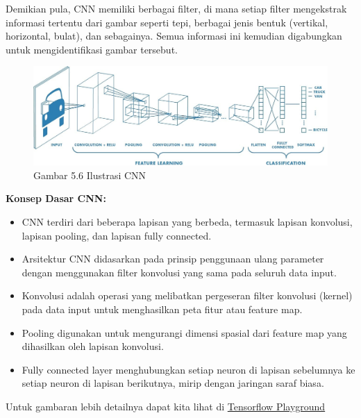 \documentclass[
  letterpaper,
  DIV=11,
  numbers=noendperiod]{scrreprt}
\providecommand{\tightlist}{%
  \setlength{\itemsep}{0pt}\setlength{\parskip}{0pt}}\usepackage{longtable,booktabs,array}
\begin{document}
Demikian pula, CNN memiliki berbagai filter, di mana setiap filter
mengekstrak informasi tertentu dari gambar seperti tepi, berbagai jenis
bentuk (vertikal, horizontal, bulat), dan sebagainya. Semua informasi
ini kemudian digabungkan untuk mengidentifikasi gambar tersebut.

\begin{figure}

{\centering \includegraphics{Asset/cnnillustration.jpeg}

}

\caption{Gambar 5.6 Ilustrasi CNN}

\end{figure}

\textbf{Konsep Dasar CNN:}

\begin{itemize}
\tightlist
\item
  CNN terdiri dari beberapa lapisan yang berbeda, termasuk lapisan
  konvolusi, lapisan pooling, dan lapisan fully connected.\\
\item
  Arsitektur CNN didasarkan pada prinsip penggunaan ulang parameter
  dengan menggunakan filter konvolusi yang sama pada seluruh data
  input.\\
\item
  Konvolusi adalah operasi yang melibatkan pergeseran filter konvolusi
  (kernel) pada data input untuk menghasilkan peta fitur atau feature
  map.\\
\item
  Pooling digunakan untuk mengurangi dimensi spasial dari feature map
  yang dihasilkan oleh lapisan konvolusi.\\
\item
  Fully connected layer menghubungkan setiap neuron di lapisan
  sebelumnya ke setiap neuron di lapisan berikutnya, mirip dengan
  jaringan saraf biasa.
\end{itemize}

Untuk gambaran lebih detailnya dapat kita lihat di
\href{http://playground.tensorflow.org/}{Tensorflow Playground}
\end{document}
